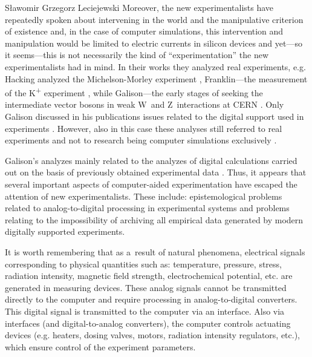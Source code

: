 \begin{artengenv}{Sławomir Grzegorz Leciejewski}
Moreover, the new experimentalists have repeatedly spoken about intervening in the world 
\parencite[][pp.149–219]{hacking_representing_1983} %
 and the manipulative criterion of existence 
\parencite[][pp.220–232]{hacking_representing_1983} %
 and, in the case of computer simulations, this intervention and manipulation would be limited to electric currents in silicon devices and yet---so it seems---this is not necessarily the kind of ``experimentation'' the new experimentalists had in mind. In their works they analyzed real experiments, e.g. Hacking analyzed the Michelson-Morley experiment 
\parencite[][pp.253–261]{hacking_representing_1983}, %
 Franklin---the measurement of the K\textsuperscript{+} experiment 
\parencite[][pp.115–131]{franklin_experiment_1990}, %
 while Galison---the early stages of seeking the intermediate vector bosons in weak W~and Z~interactions at CERN 
\parencite[][pp.198–208]{galison_how_1987}. %
 Only Galison discussed in his publications issues related to the digital support used in experiments 
\parencite[][pp.752–780]{galison_image_1997}. %
 However, also in this case these analyses still referred to real experiments and not to research being computer simulations exclusively 
\parencite[][pp.689–752]{galison_image_1997}.%




Galison's analyzes mainly related to the analyzes of digital calculations carried out on the basis of previously obtained experimental data 
\parencite[][pp.1–7, 752–771]{galison_image_1997}. %
 Thus, it appears that several important aspects of computer-aided experimentation have escaped the attention of new experimentalists. These include: epistemological problems related to analog-to-digital processing in experimental systems and problems relating to the impossibility of archiving all empirical data generated by modern digitally supported experiments.



It is worth remembering that as a~result of natural phenomena, electrical signals corresponding to physical quantities such as: temperature, pressure, stress, radiation intensity, magnetic field strength, electrochemical potential, etc. are generated in measuring devices. These analog signals cannot be transmitted directly to the computer and require processing in analog-to-digital converters. This digital signal is transmitted to the computer via an interface. Also via interfaces (and digital-to-analog converters), the computer controls actuating devices (e.g. heaters, dosing valves, motors, radiation intensity regulators, etc.), which ensure control of the experiment parameters.




\end{artengenv}
